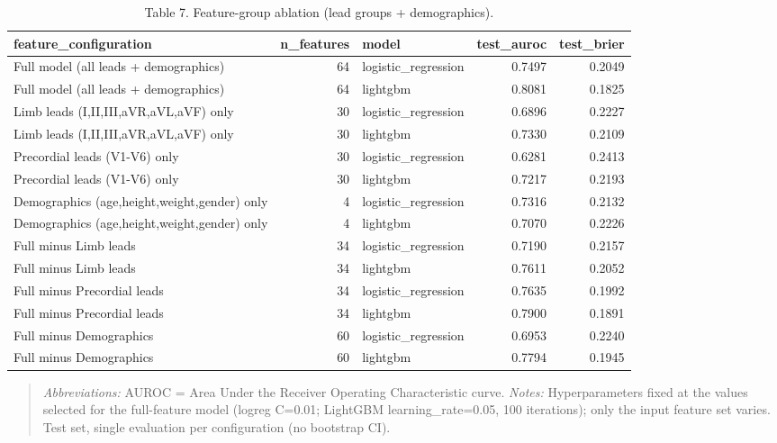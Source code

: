\begin{table}[htbp]
\centering
\caption{Table 7. Feature-group ablation (lead groups + demographics).}
\label{table7_ablation}
\begin{tabular}{lrlrr}
\toprule
feature\_configuration & n\_features & model & test\_auroc & test\_brier \\
\midrule
Full model (all leads + demographics) & 64 & logistic\_regression & 0.7497 & 0.2049 \\
Full model (all leads + demographics) & 64 & lightgbm & 0.8081 & 0.1825 \\
Limb leads (I,II,III,aVR,aVL,aVF) only & 30 & logistic\_regression & 0.6896 & 0.2227 \\
Limb leads (I,II,III,aVR,aVL,aVF) only & 30 & lightgbm & 0.7330 & 0.2109 \\
Precordial leads (V1-V6) only & 30 & logistic\_regression & 0.6281 & 0.2413 \\
Precordial leads (V1-V6) only & 30 & lightgbm & 0.7217 & 0.2193 \\
Demographics (age,height,weight,gender) only & 4 & logistic\_regression & 0.7316 & 0.2132 \\
Demographics (age,height,weight,gender) only & 4 & lightgbm & 0.7070 & 0.2226 \\
Full minus Limb leads & 34 & logistic\_regression & 0.7190 & 0.2157 \\
Full minus Limb leads & 34 & lightgbm & 0.7611 & 0.2052 \\
Full minus Precordial leads & 34 & logistic\_regression & 0.7635 & 0.1992 \\
Full minus Precordial leads & 34 & lightgbm & 0.7900 & 0.1891 \\
Full minus Demographics & 60 & logistic\_regression & 0.6953 & 0.2240 \\
Full minus Demographics & 60 & lightgbm & 0.7794 & 0.1945 \\
\bottomrule
\end{tabular}

\end{table}


\begin{quote}\small
\textit{Abbreviations:} AUROC = Area Under the Receiver Operating Characteristic curve.
\textit{Notes:} Hyperparameters fixed at the values selected for the full-feature model (logreg C=0.01; LightGBM learning_rate=0.05, 100 iterations); only the input feature set varies. Test set, single evaluation per configuration (no bootstrap CI).
\end{quote}
